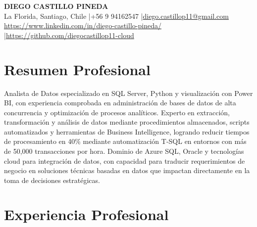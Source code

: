 \documentclass[11pt,letterpaper]{article}
\begin{document}
\begin{center}
{\fontsize{16}{19}\selectfont\textbf{\MakeUppercase{Diego Castillo Pineda}}}\\[4pt]
{\small La Florida, Santiago, Chile \quad|\quad +56 9 94162547 \quad|\quad \href{mailto:diego.castillop11@gmail.com}{diego.castillop11@gmail.com}\\
\href{https://https://www.linkedin.com/in/diego-castillo-pineda/}{https://www.linkedin.com/in/diego-castillo-pineda/} \quad|\quad \href{https://https://github.com/diegocastillop11-cloud}{https://github.com/diegocastillop11-cloud}}
\end{center}

\section{Resumen Profesional}
Analista de Datos especializado en SQL Server, Python y visualización con Power BI, con experiencia comprobada en administración de bases de datos de alta concurrencia y optimización de procesos analíticos. Experto en extracción, transformación y análisis de datos mediante procedimientos almacenados, scripts automatizados y herramientas de Business Intelligence, logrando reducir tiempos de procesamiento en 40\% mediante automatización T-SQL en entornos con más de 50,000 transacciones por hora. Dominio de Azure SQL, Oracle y tecnologías cloud para integración de datos, con capacidad para traducir requerimientos de negocio en soluciones técnicas basadas en datos que impactan directamente en la toma de decisiones estratégicas.

\section{Experiencia Profesional}
\end{document}
